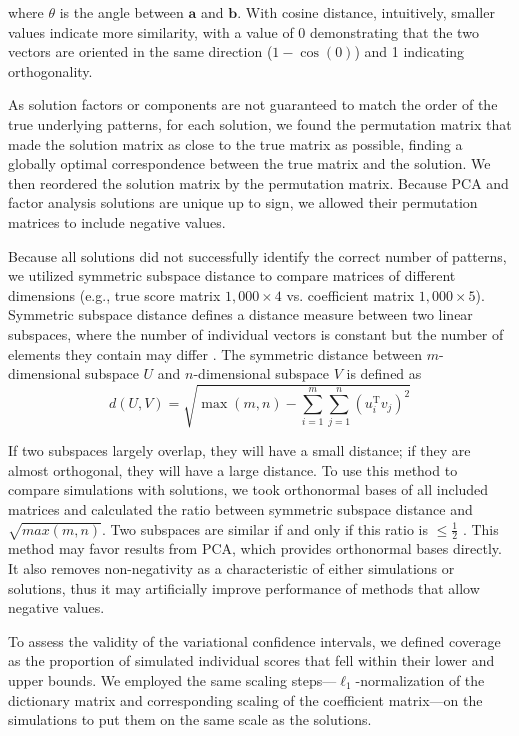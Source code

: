 where $\theta$ is the angle between $\mathbf{a}$ and $\mathbf{b}$. With cosine distance, intuitively, smaller values indicate more similarity, with a value of 0 demonstrating that the two vectors are oriented in the same direction ($1 - \cos(0)$) and 1 indicating orthogonality.

As solution factors or components are not guaranteed to match the order of the true underlying patterns, for each solution, we found the permutation matrix that made the solution matrix as close to the true matrix as possible, finding a globally optimal correspondence between the true matrix and the solution. We then reordered the solution matrix by the permutation matrix. Because PCA and factor analysis solutions are unique up to sign, we allowed their permutation matrices to include negative values.

Because all solutions did not successfully identify the correct number of patterns, we utilized symmetric subspace distance to compare  matrices of different dimensions (e.g., true score matrix $1,000 \times 4$ vs. coefficient matrix $1,000 \times 5$). Symmetric subspace distance defines a distance measure between two linear subspaces, where the number of individual vectors is constant but the number of elements they contain may differ \cite{wang2006subspace}. The symmetric distance between $m$-dimensional subspace $U$ and $n$-dimensional subspace $V$ is defined as 
\begin{equation}
d(U, V) =\sqrt{\max (m, n)-\sum_{i=1}^{m} \sum_{j=1}^{n}\left(u_{i}^{\mathrm{T}} v_{j}\right)^{2}}
\end{equation}

If two subspaces largely overlap, they will have a small distance; if they are almost orthogonal, they will have a large distance. To use this method to compare simulations with solutions, we took orthonormal bases of all included matrices and calculated the ratio between symmetric subspace distance and $\sqrt{max(m,n)}$. Two subspaces are similar if and only if this ratio is $\leq \frac{1}{2}$ \cite{wang2006subspace}. This method may favor results from PCA, which provides orthonormal bases directly. It also removes non-negativity as a characteristic of either simulations or solutions, thus it may artificially improve performance of methods that allow negative values.

To assess the validity of the variational confidence intervals, we defined coverage as the proportion of simulated individual scores that fell within their lower and upper bounds. We employed the same scaling steps---$\ell_1$-normalization of the dictionary matrix and corresponding scaling of the coefficient matrix---on the simulations to put them on the same scale as the solutions.

